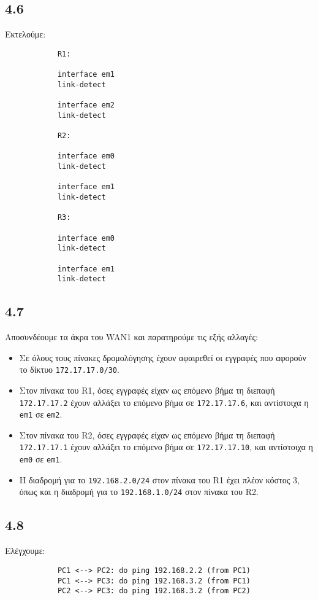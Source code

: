 \documentclass[a4paper, 12pt]{article}
\begin{document}
	\subsection*{4.6}
		Εκτελούμε:
		
		\begin{verbatim}
			R1:
			
			interface em1
			link-detect
			
			interface em2
			link-detect
			
			R2:
			
			interface em0
			link-detect
			
			interface em1
			link-detect
			
			R3:
			
			interface em0
			link-detect
			
			interface em1
			link-detect
		\end{verbatim}

	\subsection*{4.7}
		Αποσυνδέουμε τα άκρα του WAN1 και παρατηρούμε τις εξής αλλαγές:
		
		\begin{itemize}
			\item Σε όλους τους πίνακες δρομολόγησης έχουν αφαιρεθεί οι εγγραφές που αφορούν το δίκτυο \verb|172.17.17.0/30|.
			\item Στον πίνακα του R1, όσες εγγραφές είχαν ως επόμενο βήμα τη διεπαφή \verb|172.17.17.2| έχουν αλλάξει το επόμενο βήμα σε \verb|172.17.17.6|, και αντίστοιχα η \verb|em1| σε \verb|em2|.
			\item Στον πίνακα του R2, όσες εγγραφές είχαν ως επόμενο βήμα τη διεπαφή \verb|172.17.17.1| έχουν αλλάξει το επόμενο βήμα σε \verb|172.17.17.10|, και αντίστοιχα η \verb|em0| σε \verb|em1|. 
			\item Η διαδρομή για το \verb|192.168.2.0/24| στον πίνακα του R1 έχει πλέον κόστος 3, όπως και η διαδρομή για το \verb|192.168.1.0/24| στον πίνακα του R2.
		\end{itemize}

	\subsection*{4.8}
		Ελέγχουμε:
		
		\begin{verbatim}
			PC1 <--> PC2: do ping 192.168.2.2 (from PC1)
			PC1 <--> PC3: do ping 192.168.3.2 (from PC1)
			PC2 <--> PC3: do ping 192.168.3.2 (from PC2)
		\end{verbatim}
		
\end{document}
